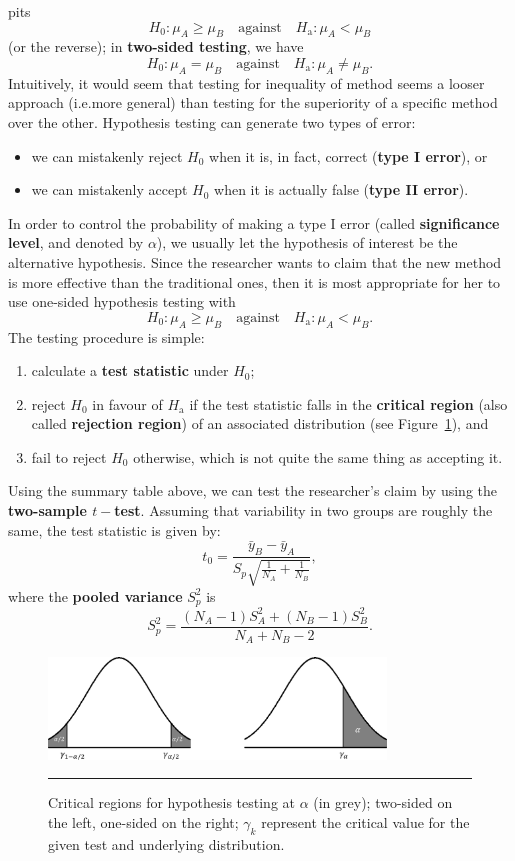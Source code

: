      \afterpage{\FloatBarrier}
pits $$H_{0}: \mu_{A} \geq \mu_{B}\quad\mbox{against}\quad H_{\textrm{a}}: \mu_{A} < \mu_{B}$$ (or the reverse); in \textbf{two-sided testing}, we have $$H_{0}: \mu_{A} = \mu_{B}\quad\mbox{against}\quad H_{\textrm{a}}: \mu_{A} \neq \mu_{B}.$$ Intuitively, it would seem that testing for inequality of method seems a looser approach (i.e.\@ more general) than testing for the superiority of a specific method over the other. 
\newl Hypothesis testing can generate two types of error: 
\begin{itemize}[noitemsep]
\item we can mistakenly reject $H_0$ when it is, in fact, correct (\textbf{type I error}), or 
\item we can mistakenly accept $H_{0}$ when it is actually false (\textbf{type II error}). 
\end{itemize}In order to control the probability of making a type I error (called \textbf{significance level}, and denoted by $\alpha$), we usually let the hypothesis of interest be the alternative hypothesis.
\newl Since the researcher wants to claim that the new method is more effective than the traditional ones, then it is most appropriate for her to use one-sided hypothesis testing with $$H_{0}: \mu_{A} \geq \mu_{B} \quad\mbox{against}\quad H_{\textrm{a}}: \mu_{A} < \mu_{B}.$$ The testing procedure is simple:
\begin{enumerate}[noitemsep]
\item calculate a \textbf{test statistic} under $H_0$;
\item reject $H_0$ in favour of $H_{\textrm{a}}$ if the test statistic falls in the \textbf{critical region} (also called \textbf{rejection region}) of an associated distribution (see Figure~\ref{fig:crit_reg}), and 
\item fail to reject $H_0$ otherwise, which is not quite the same thing as accepting it.
\end{enumerate}
Using the summary table above, we can test the researcher's claim by using the \textbf{two-sample $t-$test}. Assuming that variability in two groups are roughly the same, the test statistic is given by:
$$
    t_{0}=\frac{\bar{y}_{B}-\bar{y}_{A}}{S_{p}\sqrt{\frac{1}{N_{A}}+\frac{1}{N_{B}}}},
$$
where the \textbf{pooled variance} $S^{2}_{p}$ is
$$
    S^{2}_{p}=\frac{(N_{A}-1)S^{2}_{A}+(N_{B}-1)S^{2}_{B}}{N_{A}+N_{B}-2}.
$$
\begin{figure}[t]
\centering
\includegraphics[width=0.8\textwidth]{Images/crit_reg.png}
\caption[\small Critical regions for hypothesis testing]{\small Critical regions for hypothesis testing at $\alpha$ (in grey); two-sided on the left, one-sided on the right; $\gamma_k$ represent the critical value for the given test and underlying distribution. }\label{fig:crit_reg}\hrule
\end{figure}
